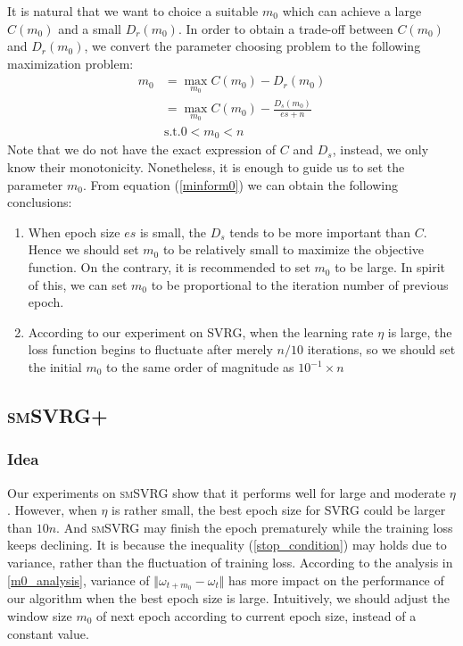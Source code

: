\documentclass[conference]{IEEEtran}
\begin{document}
It is natural that we want to choice a suitable $m_0$  which can achieve a large $C(m_0)$ and a small $D_r(m_0)$. In order to obtain a trade-off between $C(m_0)$ and $D_r(m_0)$, we convert the parameter choosing problem to the following maximization problem:
\begin{equation}
\label{minform0}
\begin{split}
m_0 &= \max\limits_{m_0} C(m_0)-D_r(m_0)\\
&= \max\limits_{m_0} C(m_0)-\frac{D_s(m_0)}{es+n}\\
&\textrm{s.t.} 0<m_0<n
\end{split}
\end{equation}
Note that we do not have the exact expression of $C$ and $D_s$, instead, we only know their monotonicity. Nonetheless, it is enough to guide us to set the parameter $m_0$. From equation (\ref{minform0}) we can obtain the following conclusions:
\begin{enumerate}
\item When epoch size $es$ is small, the $D_s$ tends to be more important than $C$. Hence we should set $m_0$ to be relatively small to maximize the objective function. On the contrary, it is recommended to set $m_0$ to be large. In spirit of this, we can set $m_0$ to be proportional to the iteration number of previous epoch.
\item According to our experiment on SVRG, when the learning rate $\eta$ is large, the loss function begins to fluctuate after merely $n/10$ iterations, so we should set the initial $m_0$ to the same order of magnitude as $10^{-1} \times n$
 \end{enumerate}
 
 \subsection{\textsc{smSVRG+}}
 \subsubsection{Idea}
 Our experiments on \textsc{smSVRG} show that it performs well for large and moderate $\eta$. However, when $\eta$ is rather small, the best epoch size for SVRG could be larger than $10n$. And \textsc{smSVRG} may finish the epoch prematurely while the training loss keeps declining. It is because the inequality (\ref{stop_condition}) may holds due to variance, rather than the fluctuation of training loss. According to the analysis in \ref{m0_analysis}, variance of $\Vert\omega_{t+m_0}-\omega_t\Vert$ has more impact on the performance of our algorithm when the best epoch size is large. Intuitively, we should adjust the window size $m_0$ of next epoch according to current epoch size, instead of a constant value.
\end{document}
